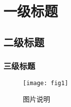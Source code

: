 \section{一级标题}
\subsection{二级标题}
\subsubsection{三级标题}
\begin{figure}[htbp]%
  \centering
  \texttt{[image: fig1]}%
  \caption{图片说明}
  \label{fig:exampleLine}
\end{figure}

